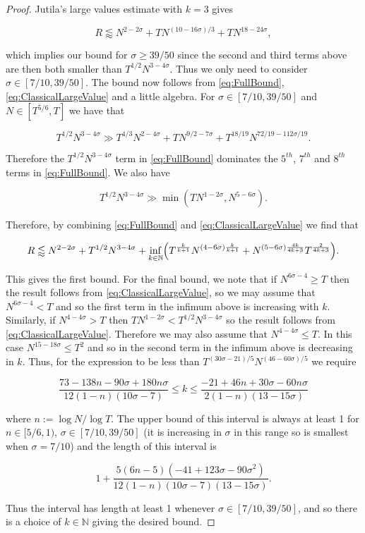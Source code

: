 \documentclass{amsart}
\theoremstyle{plain}
\numberwithin{equation}{section}
\begin{document}
\begin{proof}
Jutila's large values estimate \cite[Theorem (1.4)]{J} with $k=3$ gives

\[
R\lessapprox N^{2-2\sigma}+TN^{(10-16\sigma)/3}+TN^{18-24\sigma},
\]

which implies our bound for $\sigma\ge 39/50$ since the second and third terms above are then both smaller than $T^{1/2}N^{3-4\sigma}$. Thus we only need to consider $\sigma\in [7/10,39/50]$. The bound now follows from \eqref{eq:FullBound}, \eqref{eq:ClassicalLargeValue} and a little algebra. For $\sigma\in[7/10,39/50]$ and $N\in [T^{5/6},T]$ we have that

\[
T^{1/2}N^{3-4\sigma}\gg T^{4/3}N^{2-4\sigma}+T N^{9/2-7\sigma}+T^{18/19}N^{72/19-112\sigma/19}.
\]

Therefore the $T^{1/2}N^{3-4\sigma}$ term in \eqref{eq:FullBound} dominates the $5^{th}$, $7^{th}$ and $8^{th}$ terms in \eqref{eq:FullBound}. We also have

\[
T^{1/2}N^{3-4\sigma}\gg \min(TN^{1-2\sigma},N^{5-6\sigma}).
\]

Therefore, by combining \eqref{eq:FullBound} and \eqref{eq:ClassicalLargeValue} we find that

\[
R\lessapprox  N^{2-2\sigma}+T^{1/2}N^{3-4\sigma}+\inf_{k\in\mathbb{N}}\Bigl(T^{\frac{k}{k+1}}N^{(4-6\sigma)\frac{k}{k+1}}+N^{(5-6\sigma)\frac{4k}{4k+3}}T^{\frac{2}{4k+3}}\Bigr).
\]

This gives the first bound. For the final bound, we note that if $N^{6\sigma-4}\ge T$ then the result follows from \eqref{eq:ClassicalLargeValue}, so we may assume that $N^{6\sigma-4}<T$ and so the first term in the infimum above is increasing with $k$. Similarly, if $N^{4-4\sigma}>T$ then $TN^{1-2\sigma}<T^{1/2}N^{3-4\sigma}$ so the result follows from \eqref{eq:ClassicalLargeValue}. Therefore we may also assume that $N^{4-4\sigma}\le T$. In this case $N^{15-18\sigma}\le T^2$ and so in the second term in the infimum above is decreasing in $k$. Thus, for the expression to be less than $T^{(30\sigma-21)/5}N^{(46-60\sigma)/5}$ we require

\[
\frac{73 - 138 n - 90 \sigma + 180 n \sigma}{12(1-n)(10\sigma-7)}\le k \le \frac{-21 + 46 n + 30 \sigma - 60 n \sigma}{2(1-n)(13-15\sigma)}
\]

where $n:=\log{N}/\log{T}$. The upper bound of this interval is always at least 1 for $n\in[5/6,1)$, $\sigma\in [7/10,39/50]$ (it is increasing in $\sigma$ in this range so is smallest when $\sigma=7/10$) and the length of this interval is

\[
1+\frac{5(6n-5)(-41 + 123 \sigma - 90 \sigma^2)}{12(1-n)(10\sigma-7)(13-15\sigma)}.
\]

Thus the interval has length at least 1 whenever $\sigma\in [7/10,39/50]$, and so there is a choice of $k\in\mathbb{N}$ giving the desired bound.
\end{proof}
\end{document}
